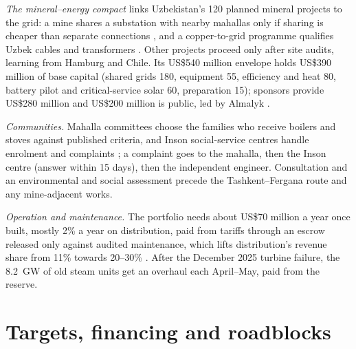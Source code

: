 \documentclass[11pt,letterpaper]{article}
\begin{document}
\textit{The mineral--energy compact} links Uzbekistan's 120 planned mineral projects \cite{pres-minerals} to the grid: a mine shares a substation with nearby mahallas only if sharing is cheaper than separate connections \cite{columbia-shared}, and a copper-to-grid programme qualifies Uzbek cables and transformers \cite{iea-minerals}. Other projects proceed only after site audits, learning from Hamburg and Chile. Its US\$540 million envelope holds US\$390 million of base capital (shared grids 180, equipment 55, efficiency and heat 80, battery pilot and critical-service solar 60, preparation 15); sponsors provide US\$280 million and US\$200 million is public, led by Almalyk \cite{team-minerals}.

\textit{Communities.} Mahalla committees choose the families who receive boilers and stoves against published criteria, and Inson social-service centres handle enrolment and complaints \cite{wb-inson}; a complaint goes to the mahalla, then the Inson centre (answer within 15 days), then the independent engineer. Consultation and an environmental and social assessment precede the Tashkent--Fergana route and any mine-adjacent works.

\textit{Operation and maintenance.} The portfolio needs about US\$70 million a year once built, mostly 2\% a year on distribution, paid from tariffs through an escrow released only against audited maintenance, which lifts distribution's revenue share from 11\% towards 20--30\% \cite{wb-p504630}. After the December 2025 turbine failure, the 8.2~GW of old steam units get an overhaul each April--May, paid from the reserve.

\noindent{}

\section{Targets, financing and roadblocks}\label{sec:financing}
\end{document}
